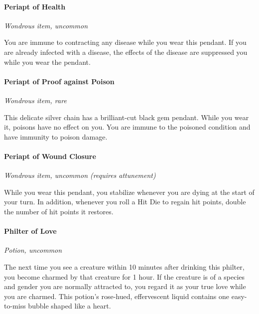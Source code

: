 \documentclass[
]{article}
\begin{document}
\hypertarget{periapt-of-health}{%
\paragraph{Periapt of Health}\label{periapt-of-health}}

\emph{Wondrous item, uncommon}

You are immune to contracting any disease while you wear this pendant.
If you are already infected with a disease, the effects of the disease
are suppressed you while you wear the pendant.

\hypertarget{periapt-of-proof-against-poison}{%
\paragraph{Periapt of Proof against
Poison}\label{periapt-of-proof-against-poison}}

\emph{Wondrous item, rare}

This delicate silver chain has a brilliant-cut black gem pendant. While
you wear it, poisons have no effect on you. You are immune to the
poisoned condition and have immunity to poison damage.

\hypertarget{periapt-of-wound-closure}{%
\paragraph{Periapt of Wound Closure}\label{periapt-of-wound-closure}}

\emph{Wondrous item, uncommon (requires attunement)}

While you wear this pendant, you stabilize whenever you are dying at the
start of your turn. In addition, whenever you roll a Hit Die to regain
hit points, double the number of hit points it restores.

\hypertarget{philter-of-love}{%
\paragraph{Philter of Love}\label{philter-of-love}}

\emph{Potion, uncommon}

The next time you see a creature within 10 minutes after drinking this
philter, you become charmed by that creature for 1 hour. If the creature
is of a species and gender you are normally attracted to, you regard it
as your true love while you are charmed. This potion's rose-hued,
effervescent liquid contains one easy-to-miss bubble shaped like a
heart.
\end{document}
